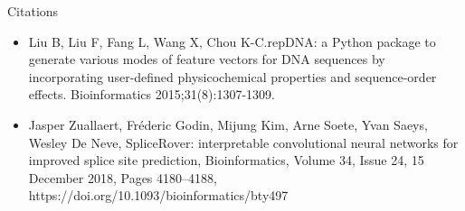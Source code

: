 \documentclass[10pt]{beamer}
\begin{document}
\begin{frame}{Citations}
	\footnotesize
	\begin{itemize}
		\item Liu B, Liu F, Fang L, Wang X, Chou K-C.repDNA: a Python package to generate various modes of feature vectors for DNA sequences by incorporating user-defined physicochemical properties and sequence-order effects. Bioinformatics 2015;31(8):1307-1309.
		\item Jasper Zuallaert, Fréderic Godin, Mijung Kim, Arne Soete, Yvan Saeys, Wesley De Neve, SpliceRover: interpretable convolutional neural networks for improved splice site prediction, Bioinformatics, Volume 34, Issue 24, 15 December 2018, Pages 4180–4188, https://doi.org/10.1093/bioinformatics/bty497
	\end{itemize}
\end{frame}
\end{document}

